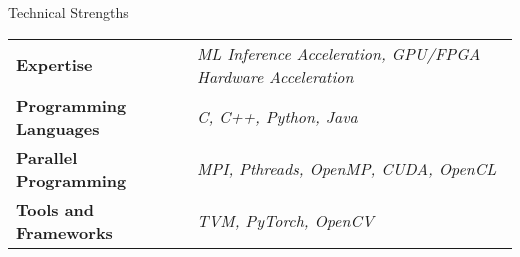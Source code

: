 \documentclass[
	11pt, %
]{./../assets/resume} %
\begin{document}
	




\begin{rSection}{Technical Strengths}

	\def\arraystretch{1.5}

	\begin{tabular}{ l l}
		\textbf{Expertise} & \emph{ML Inference Acceleration, GPU/FPGA Hardware Acceleration} \\
		\textbf{Programming Languages} & \emph{C, C++, Python, Java} \\
            \textbf{Parallel Programming} & \emph{MPI, Pthreads, OpenMP, CUDA, OpenCL} \\
		\textbf{Tools and Frameworks} & \emph{TVM, PyTorch, OpenCV} \\ 
	\end{tabular}

\end{rSection}

\end{document}
